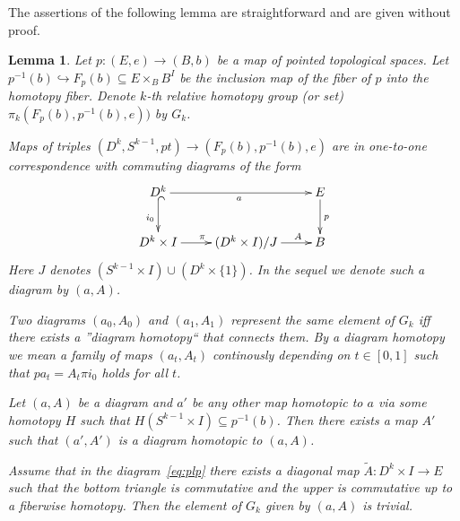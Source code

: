 \documentclass[oneside, 10pt]{amsart}
\theoremstyle{plain}
\numberwithin{equation}{section}
\newtheorem{lemma}{Lemma}
\numberwithin{lemma}{section}
\theoremstyle{remark}
\theoremstyle{definition}
\begin{document}
The assertions of the following lemma are straightforward and are given without proof.
\begin{lemma} \label{lem:topo-facts} Let $p\colon (E, e) \to (B, b)$ be a map of pointed topological spaces.
Let $p^{-1}(b) \hookrightarrow F_{p}(b) \subseteq E\times_B B^I$ be the inclusion map of the fiber of $p$ into the homotopy fiber.
Denote $k$-th relative homotopy group (or set) $\pi_k(F_p(b), p^{-1}(b), e))$ by $G_k$.
\begin{lemlist}
 \item Maps of triples $(D^k, S^{k-1}, pt) \to (F_p(b), p^{-1}(b), e)$ are in one-to-one correspondence with commuting diagrams of the form
   \begin{equation} \xymatrix{ 
    D^k \ar@{^{(}->}_{i_0}[d]  \ar_{a}[rr] & & E \ar^{p}[d]  \\
    D^k\times I \ar^{\pi}[r] & (D^k \times I) / J \ar^(.7){A}[r] & B}
    \label{eq:plp} \end{equation}
    Here $J$ denotes $(S^{k-1} \times I) \cup (D^k \times \{1\})$. In the sequel we denote such a diagram by $(a, A)$.
 \item Two diagrams $(a_0, A_0)$ and $(a_1, A_1)$ represent the same element of $G_k$ iff there exists a ''diagram homotopy`` that connects them.
     By a diagram homotopy we mean a family of maps $(a_t, A_t)$ continously depending on $t\in [0, 1]$ such that $pa_t = A_t \pi i_0$ holds for all $t$.
 \item \label{item:continue} Let $(a, A)$ be a diagram and $a'$ be any other map 
     homotopic to $a$ via some homotopy $H$ such that $H(S^{k-1}\times I) \subseteq p^{-1}(b)$.
     Then there exists a map $A'$ such that $(a', A')$ is a diagram homotopic to $(a, A)$.
 \item \label{item:weaker} 
     Assume that in the diagram~\eqref{eq:plp} there exists a diagonal map $\widetilde{A} \colon D^k\times I \to E$ 
     such that the bottom triangle is commutative and the upper is commutative up to a fiberwise homotopy.
     Then the element of $G_k$ given by $(a, A)$ is trivial.
\end{lemlist}
\end{lemma}
\begin{comment}
 Denote by $H$ the fiberwise homotopy between $a$ and $\widetilde{A}i_0$.
 Consider the following family of diagrams:
 \[ a_t(x) = \left\{\def\arraystretch{1.2}%
  \begin{array}{@{}c@{\quad}l@{}}
    H(x, 2t)               & 0\leq t\leq \frac{1}{2}\\
    \widetilde{A}(x, 2t-1) & \frac{1}{2}\leq t \leq 1\end{array}\right.;\  \
  A_t(x, s) = \left\{\def\arraystretch{1.2}%
  \begin{array}{@{}c@{\quad}l@{}}
    A(x, s)                & 0\leq t\leq \frac{1}{2} \\
    A(x, s + (2t-1)(1-s)) &  \frac{1}{2}\leq t \leq 1
  \end{array}\right.\]
 It is clear that $a_0=a$ and $A_0=A$ while the image of $a_1$ is contained in $p^{-1}(b)$.
\end{comment}
\end{document}
